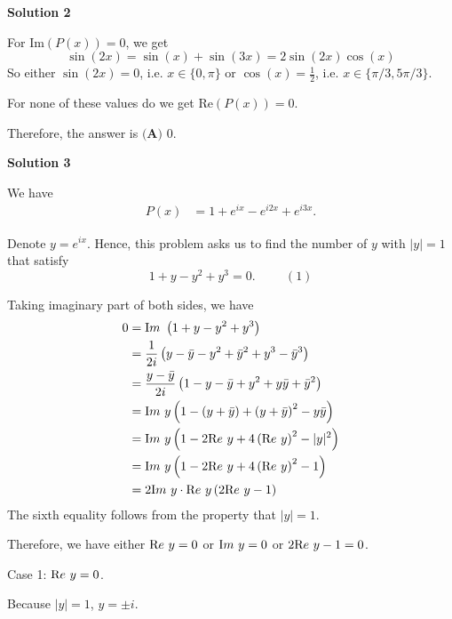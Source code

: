 \begin{enumerate}
 



\textbf{Solution 2}

For $\textrm{Im}(P(x))=0$, we get 
 \[\sin(2x)=\sin(x)+\sin(3x)=2\sin(2x)\cos(x)\] So either $\sin(2x)=0$, i.e. $x\in\{0,\pi\}$ or $\cos(x)=\frac 12$, i.e. $x\in \{\pi/3, 5\pi/3\}$.

 For none of these values do we get $\textrm{Re}(P(x))=0$.

 Therefore, the answer is $\boxed{\textbf{(A) }0}$.

 



\textbf{Solution 3}

We have
 \begin{align*} P \left( x \right) & = 1 + e^{ix} - e^{i 2x} + e^{i 3x} . \end{align*}


 Denote $y = e^{i x}$. Hence, this problem asks us to find the number of $y$ with $| y| = 1$ that satisfy
 \[ 1 + y - y^2 + y^3 = 0 . \hspace{1cm} (1) \]

 Taking imaginary part of both sides, we have
 \begin{align*} 0 & = {\textrm Im} \ \left( 1 + y - y^2 + y^3 \right) \\ & = \frac{1}{2i} \left( y - \bar y - y^2 + \bar y^2 + y^3 - \bar y^3 \right) \\ & = \frac{y - \bar y}{2i} \left( 1 - y - \bar y + y^2 + y \bar y + \bar y^2 \right) \\ & = {\textrm Im} \ y \left( 1 - \left( y + \bar y \right) + \left( y + \bar y \right)^2 - y \bar y \right) \\ & = {\textrm Im} \ y \left( 1 - 2 {\textrm Re} \ y + 4 \left( {\textrm Re} \ y \right)^2 - |y|^2 \right) \\ & = {\textrm Im} \ y \left( 1 - 2 {\textrm Re} \ y + 4 \left( {\textrm Re} \ y \right)^2 - 1 \right) \\ & = 2 {\textrm Im} \ y \cdot {\textrm Re} \ y \left( 2 {\textrm Re} \ y - 1 \right) \\ \end{align*}
The sixth equality follows from the property that $|y| = 1$.

 Therefore, we have either ${\textrm Re} \ y = 0$ or ${\textrm Im} \ y = 0$ or $2 {\textrm Re} \ y - 1 = 0$.

 Case 1: ${\textrm Re} \ y = 0$.

 Because $|y| = 1$, $y = \pm i$.


\end{enumerate}
